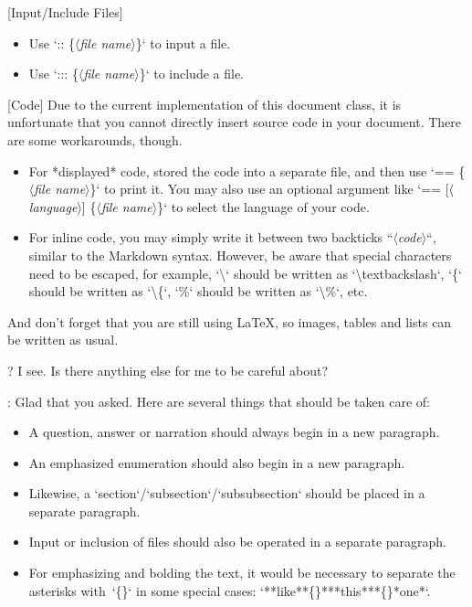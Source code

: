 \documentclass[%
  use style = classical,
  scroll,
]{Q-A}
\newcommand{\meta}[1]{$\langle${\normalfont\itshape#1}$\rangle$}
\def\textcolon{:}
\def\texteqsign{=}
\def\textbacktick{`}
\def\textast{*}
\begin{document}
  [Input/Include Files]
  \begin{itemize}
    \item Use `\textcolon\textcolon{} \{\meta{file name}\}` to input a file.
    \item Use `\textcolon\textcolon\textcolon{} \{\meta{file name}\}` to include a file.
  \end{itemize}

  [Code]
  Due to the current implementation of this document class, it is unfortunate that you cannot directly insert source code in your document. There are some workarounds, though.
  \begin{itemize}
    \item For *displayed* code, stored the code into a separate file, and then use `\texteqsign\texteqsign{} \{\meta{file name}\}` to print it. You may also use an optional argument like `\texteqsign\texteqsign{} [\meta{language}] \{\meta{file name}\}` to select the language of your code.
    \item For inline code, you may simply write it between two backticks `\textbacktick\meta{code}\textbacktick`, similar to the Markdown syntax. However, be aware that special characters need to be escaped, for example, `\textbackslash` should be written as `\textbackslash textbackslash`, `\{` should be written as `\textbackslash\{`, `\%` should be written as `\textbackslash\%`, etc.
  \end{itemize}

  And don't forget that you are still using \LaTeX, so images, tables and lists can be written as usual.

?
  I see. Is there anything else for me to be careful about?

:
  Glad that you asked. Here are several things that should be taken care of:
  \begin{itemize}
    \item A question, answer or narration should always begin in a new paragraph.
    \item An emphasized enumeration should also begin in a new paragraph.
    \item Likewise, a `section`/`subsection`/`subsubsection` should be placed in a separate paragraph.
    \item Input or inclusion of files should also be operated in a separate paragraph.
    \item For emphasizing and bolding the text, it would be necessary to separate the asterisks with~`\{\}` in some special cases: `\textast\textast like\textast\textast\{\}\textast\textast\textast this\textast\textast\textast\{\}\textast one\textast`.
  \end{itemize}
\end{document}
